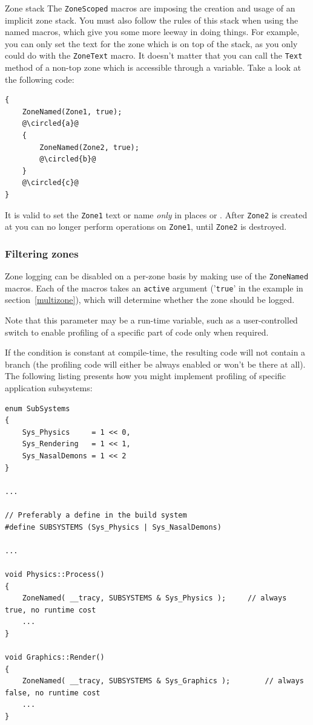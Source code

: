 \documentclass[hidelinks,titlepage,a4paper,twoside]{article}
\newcommand*\circled[1]{\tikz[baseline=(char.base)]{
    \node[shape=circle,draw,inner sep=1.5pt] (char) {#1};}}
\begin{document}
\begin{bclogo}[
noborder=true,
couleur=black!5,
logo=\bcattention
]{Zone stack}
The \texttt{ZoneScoped} macros are imposing the creation and usage of an implicit zone stack. You must also follow the rules of this stack when using the named macros, which give you some more leeway in doing things. For example, you can only set the text for the zone which is on top of the stack, as you only could do with the \texttt{ZoneText} macro. It doesn't matter that you can call the \texttt{Text} method of a non-top zone which is accessible through a variable. Take a look at the following code:

\begin{lstlisting}
{
	ZoneNamed(Zone1, true);
	@\circled{a}@
	{
		ZoneNamed(Zone2, true);
		@\circled{b}@
	}
	@\circled{c}@
}
\end{lstlisting}

It is valid to set the \texttt{Zone1} text or name \emph{only} in places \circled{a} or \circled{c}. After \texttt{Zone2} is created at \circled{b} you can no longer perform operations on \texttt{Zone1}, until \texttt{Zone2} is destroyed.
\end{bclogo}

\subsubsection{Filtering zones}
\label{filteringzones}

Zone logging can be disabled on a per-zone basis by making use of the \texttt{ZoneNamed} macros. Each of the macros takes an \texttt{active} argument ('\texttt{true}' in the example in section~\ref{multizone}), which will determine whether the zone should be logged.

Note that this parameter may be a run-time variable, such as a user-controlled switch to enable profiling of a specific part of code only when required.

If the condition is constant at compile-time, the resulting code will not contain a branch (the profiling code will either be always enabled or won't be there at all). The following listing presents how you might implement profiling of specific application subsystems:

\begin{lstlisting}
enum SubSystems
{
	Sys_Physics		= 1 << 0,
	Sys_Rendering	= 1 << 1,
	Sys_NasalDemons	= 1 << 2
}

...

// Preferably a define in the build system
#define SUBSYSTEMS (Sys_Physics | Sys_NasalDemons)

...

void Physics::Process()
{
	ZoneNamed( __tracy, SUBSYSTEMS & Sys_Physics );		// always true, no runtime cost
	...
}

void Graphics::Render()
{
	ZoneNamed( __tracy, SUBSYSTEMS & Sys_Graphics );		// always false, no runtime cost
	...
}
\end{lstlisting}
\end{document}
